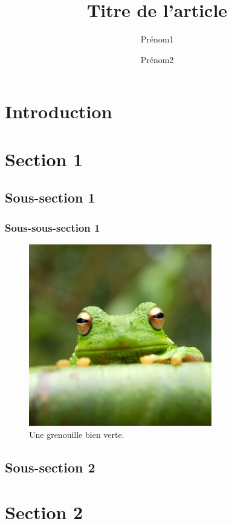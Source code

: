 \documentclass[french]{./sageo}
\title{Titre de l'article}
\author[1]{Prénom1}{Nom1}
\author[2]{Prénom2}{Nom2}
\begin{document}
\maketitle

\newpage

\section{Introduction}

\section{Section 1}

\subsection{Sous-section 1}

\subsubsection{Sous-sous-section 1}

\begin{figure}[h]
   \centering  \includegraphics[width=8cm]{grenouille.jpg}
  \caption{\label{fig:1} Une grenouille bien verte.}
\end{figure}

\subsection{Sous-section 2}

\section{Section 2}
\end{document}
